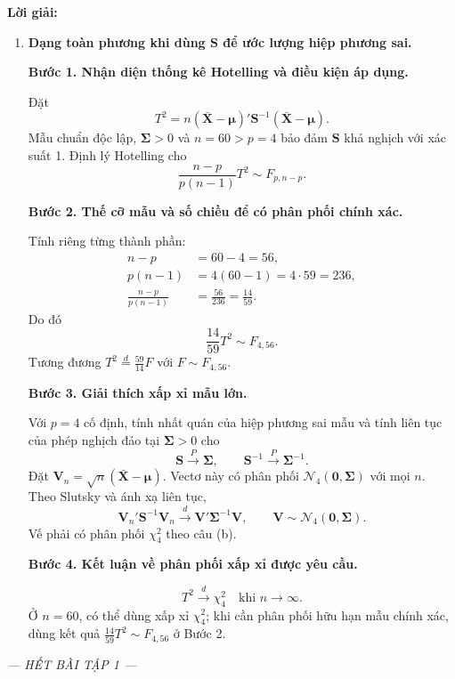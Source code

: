 \documentclass[11pt,a4paper]{article}
\renewcommand{\boldsymbol}[1]{\symbf{#1}}
\newenvironment{solution}{%
  \par\medskip\noindent\textbf{Lời giải:}\par\nopagebreak[4]\smallskip\noindent\ignorespaces
}{\par}
\newcommand{\answer}[1]{\boxed{#1}}
\newcommand{\step}[2]{\par\medskip\noindent\textbf{Bước #1. #2}\par\nopagebreak[4]\smallskip\noindent}
\begin{document}
\begin{solution}
\begin{enumerate}[label=\textbf{\alph*)}]
\item \textbf{Dạng toàn phương khi dùng $\mathbf{S}$ để ước lượng hiệp phương sai.}\par\nopagebreak[4]
\step{1}{Nhận diện thống kê Hotelling và điều kiện áp dụng.}
Đặt
\[
T^2=n(\bar{\mathbf{X}}-\boldsymbol{\mu})'\mathbf{S}^{-1}
(\bar{\mathbf{X}}-\boldsymbol{\mu}).
\]
Mẫu chuẩn độc lập, $\boldsymbol{\Sigma}>0$ và $n=60>p=4$ bảo đảm
$\mathbf{S}$ khả nghịch với xác suất 1. Định lý Hotelling cho
\[
\frac{n-p}{p(n-1)}T^2\sim F_{p,n-p}.
\]
\step{2}{Thế cỡ mẫu và số chiều để có phân phối chính xác.}
Tính riêng từng thành phần:
\begin{align*}
n-p&=60-4=56,\\
p(n-1)&=4(60-1)=4\cdot59=236,\\
\frac{n-p}{p(n-1)}&=\frac{56}{236}=\frac{14}{59}.
\end{align*}
Do đó
\[
\answer{\frac{14}{59}T^2\sim F_{4,56}}.
\]
Tương đương $T^2\stackrel{d}{=}\frac{59}{14}F$ với $F\sim F_{4,56}$.
\step{3}{Giải thích xấp xỉ mẫu lớn.}
Với $p=4$ cố định, tính nhất quán của hiệp phương sai mẫu và tính liên tục
của phép nghịch đảo tại $\boldsymbol{\Sigma}>0$ cho
\[
\mathbf{S}\xrightarrow{P}\boldsymbol{\Sigma},\qquad
\mathbf{S}^{-1}\xrightarrow{P}\boldsymbol{\Sigma}^{-1}.
\]
Đặt $\mathbf{V}_n=\sqrt{n}(\bar{\mathbf{X}}-\boldsymbol{\mu})$.
Vectơ này có phân phối $\mathcal{N}_4(\mathbf{0},\boldsymbol{\Sigma})$ với mọi $n$.
Theo Slutsky và ánh xạ liên tục,
\[
\mathbf{V}_n'\mathbf{S}^{-1}\mathbf{V}_n
\xrightarrow{d}\mathbf{V}'\boldsymbol{\Sigma}^{-1}\mathbf{V},\qquad
\mathbf{V}\sim\mathcal{N}_4(\mathbf{0},\boldsymbol{\Sigma}).
\]
Vế phải có phân phối $\chi_4^2$ theo câu (b).
\step{4}{Kết luận về phân phối xấp xỉ được yêu cầu.}
\[
\answer{T^2\xrightarrow{d}\chi_4^2\quad\text{khi }n\to\infty}.
\]
Ở $n=60$, có thể dùng xấp xỉ $\chi_4^2$; khi cần phân phối hữu hạn mẫu
chính xác, dùng kết quả $\frac{14}{59}T^2\sim F_{4,56}$ ở Bước 2.
\end{enumerate}
\end{solution}

\vfill
\begin{center}
{\small\itshape --- HẾT BÀI TẬP 1 ---}
\end{center}
\end{document}
